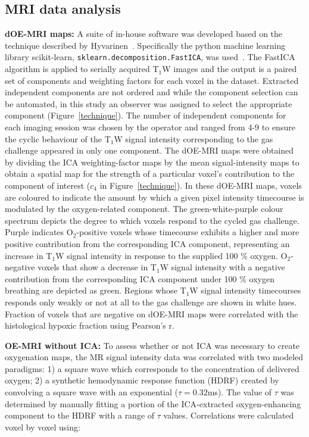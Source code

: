\subsection{MRI data analysis}
\label{doemri_mrianalysis2}
\textbf{dOE-MRI maps:} A suite of in-house software was developed based on the technique described by Hyvarinen~\cite{Hyvarinen:2000vk}.
Specifically the python machine learning library scikit-learn, \texttt{sklearn.decomposition.FastICA}, was used~\cite{Pedregosa:2011tv}.
The Fast\acs{ICA} algorithm is applied to serially acquired T$_1$W images and the output is a paired set of components and weighting factors for each voxel in the dataset.
Extracted independent components are not ordered and while the component selection can be automated, in this study an observer was assigned to select the appropriate component (Figure~\ref{technique}).
The number of independent components for each imaging session was chosen by the operator and ranged from 4-9 to ensure the cyclic behaviour of the T$_1$W signal intensity corresponding to the gas challenge appeared in only one component. 
The \acs{dOE-MRI} maps were obtained by dividing the \acs{ICA} weighting-factor maps by the mean signal-intensity maps to obtain a spatial map for the strength of a particular voxel's contribution to the component of interest ($c_4$ in Figure~\ref{technique}).
In these \acs{dOE-MRI} maps, voxels are coloured to indicate the amount by which a given pixel intensity timecourse is modulated by the oxygen-related component.  
The green-white-purple colour spectrum depicts the degree to which voxels respond to the cycled gas challenge.
Purple indicates O$_2$-positive voxels whose timecourse exhibits a higher and more positive contribution from the corresponding \acs{ICA} component, representing an increase in T$_1$W signal intensity in response to the supplied 100 \% oxygen. 
O$_2$-negative voxels that show a decrease in T$_1$W signal intensity with a negative contribution from the corresponding \acs{ICA} component under 100 \% oxygen breathing are depicted as green. 
Regions whose T$_1$W signal intensity timecourses responds only weakly or not at all to the gas challenge are shown in white hues.
Fraction of voxels that are negative on \acs{dOE-MRI} maps were correlated with the histological hypoxic fraction using Pearson's r.

\noindent\textbf{OE-MRI without \acs{ICA}:} To assess whether or not \acs{ICA} was necessary to create oxygenation maps, the MR signal intensity data was correlated with two modeled paradigms: 1) a square wave which corresponds to the concentration of delivered oxygen; 2) a synthetic hemodynamic response function (HDRF) created by convolving a square wave with an exponential ($\tau=0.32$ms).
The value of $\tau$ was determined by manually fitting a portion of the ICA-extracted oxygen-enhancing component to the HDRF with a range of $\tau$ values.
Correlations were calculated voxel by voxel using:

